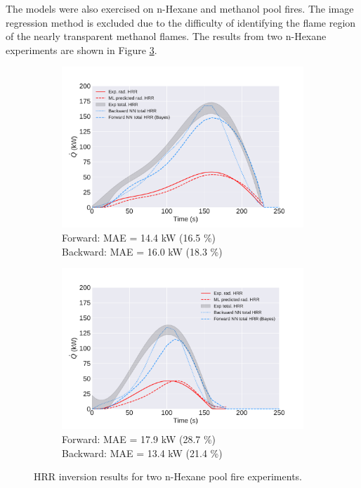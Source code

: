 \documentclass{article}
\begin{document}
The models were also exercised on n-Hexane and methanol pool fires. The image regression method is excluded due to the difficulty of identifying the flame region of the nearly transparent methanol flames. The results from two n-Hexane experiments are shown in Figure \ref{fig:nhex_fires}.

\begin{figure}[htbp]
  \centering
  \begin{subfigure}[t]{.45\textwidth}
      \centering
      \includegraphics[width=\textwidth,keepaspectratio]{figures/nhex_12in_1_final.pdf}
      \caption{Forward: MAE = 14.4 kW (16.5 \%) \\ Backward: MAE = 16.0 kW (18.3 \%)}
      \label{fig:nhex_12in_1}
  \end{subfigure}
  \begin{subfigure}[t]{.45\textwidth}
      \centering
      \includegraphics[width=\textwidth ,keepaspectratio]{figures/nhex_12in_2_final.pdf}
      \caption{ Forward: MAE = 17.9 kW (28.7 \%) \\ Backward: MAE = 13.4 kW (21.4 \%)}
      \label{fig:nhex_12in_2}
  \end{subfigure}
  \caption{HRR inversion results for two n-Hexane pool fire experiments.} 
  \label{fig:nhex_fires}
\end{figure}
\end{document}
